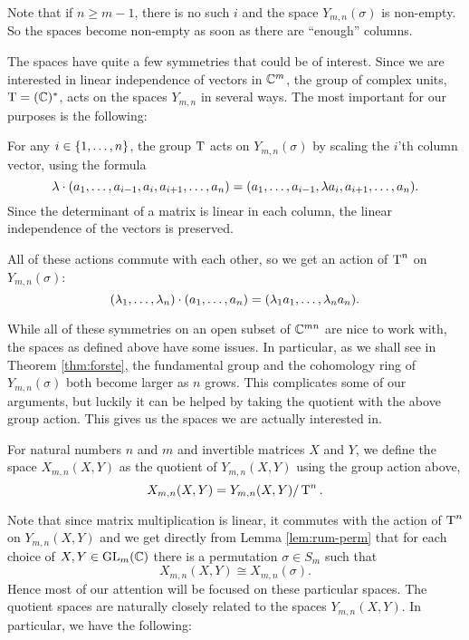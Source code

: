 \begin{remark}
  Note that if $n \geq m-1$, there is no such $i$ and the space
  $Y_{m,n}(\sigma)$ is non-empty. So the spaces become non-empty as
  soon as there are ``enough'' columns.
\end{remark}


The spaces have quite a few symmetries that could be of interest.
Since we are interested in linear independence of vectors in $\mathbb{C}^m$,
the group of complex units, $\operatorname{T}=(\mathbb{C})^*$, acts on the spaces $Y_{m,n}$
in several ways. The 
most important for our purposes is the following:
\begin{definition}
  For any $i \in \left\{ 1,\dots,n \right\}$, the group $\operatorname{T}$ acts
  on $Y_{m,n}(\sigma)$ by scaling the $i$'th column vector,
  using the formula
  \[ \lambda \cdot (a_1,\dots,a_{i-1},a_i,a_{i+1},\dots,a_n) =
  (a_1,\dots,a_{i-1},\lambda a_i,a_{i+1},\dots,a_n). \]
  Since the determinant of a matrix is linear in each column, the
  linear independence of the vectors is preserved.

  All of these actions commute with each other, so we get an action of
  $\operatorname{T}^n$ on $Y_{m,n}(\sigma)$:
  \[ (\lambda_1,\dots,\lambda_n) \cdot (a_1,\dots,a_n) = (\lambda_1 a_1,\dots, \lambda_n
  a_n). \]
\end{definition}

While all of these symmetries on an open subset of $\mathbb{C}^{mn}$ are nice
to work with, the spaces as defined above have some issues. In
particular, as we shall see in Theorem \ref{thm:forste}, the
fundamental group and the cohomology ring of
$Y_{m,n}(\sigma)$ both become larger as $n$ grows. This complicates
some of our arguments, but luckily it can be helped by taking the
quotient with the above group action. This gives us the spaces we are
actually interested in.

\begin{definition}
  For natural numbers $n$ and $m$ and invertible matrices $X$ and $Y$,
  we define the space $X_{m,n}(X,Y)$ as the quotient of $Y_{m,n}(X,Y)$
  using the group action above,
  \[ X_{m,n}(X,Y) = Y_{m,n}(X,Y) / \operatorname{T}^n. \]
\end{definition}

Note that since matrix multiplication is linear, it commutes with the
action of $\operatorname{T}^n$ on $Y_{m,n}(X,Y)$ and we get directly from Lemma
\ref{lem:rum-perm} that for each choice of $X,Y\in \mathrm{GL}_m(\mathbb{C})$ there is
a permutation $\sigma \in S_m$ such that
\[ X_{m,n}(X,Y) \cong X_{m,n}(\sigma). \]
Hence most of our attention will be focused on these particular
spaces. The quotient spaces are naturally closely related to the
spaces $Y_{m,n}(X,Y)$. In particular, we have the following:

